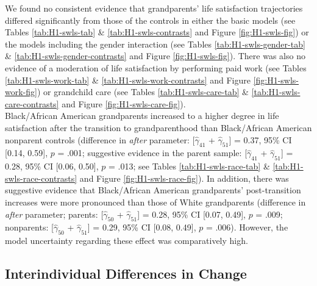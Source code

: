 \documentclass[
  english,
  man,floatsintext]{apa7}
\begin{document}
We found no consistent evidence that grandparents' life satisfaction trajectories differed significantly from those of the controls in either the basic models (see Tables \ref{tab:H1-swls-tab} \& \ref{tab:H1-swls-contrasts} and Figure \ref{fig:H1-swls-fig}) or the models including the gender interaction (see Tables \ref{tab:H1-swls-gender-tab} \& \ref{tab:H1-swls-gender-contrasts} and Figure \ref{fig:H1-swls-fig}). There was also no evidence of a moderation of life satisfaction by performing paid work (see Tables \ref{tab:H1-swls-work-tab} \& \ref{tab:H1-swls-work-contrasts} and Figure \ref{fig:H1-swls-work-fig}) or grandchild care (see Tables \ref{tab:H1-swls-care-tab} \& \ref{tab:H1-swls-care-contrasts} and Figure \ref{fig:H1-swls-care-fig}).\\
Black/African American grandparents increased to a higher degree in life satisfaction after the transition to grandparenthood than Black/African American nonparent controls (difference in \emph{after} parameter: {[}\(\hat{\gamma}_{41}\) + \(\hat{\gamma}_{51}\){]} = 0.37, 95\% CI {[}0.14, 0.59{]}, \(p\) = .001; suggestive evidence in the parent sample: {[}\(\hat{\gamma}_{41}\) + \(\hat{\gamma}_{51}\){]} = 0.28, 95\% CI {[}0.06, 0.50{]}, \(p\) = .013; see Tables \ref{tab:H1-swls-race-tab} \& \ref{tab:H1-swls-race-contrasts} and Figure \ref{fig:H1-swls-race-fig}). In addition, there was suggestive evidence that Black/African American grandparents' post-transition increases were more pronounced than those of White grandparents (difference in \emph{after} parameter; parents: {[}\(\hat{\gamma}_{50}\) + \(\hat{\gamma}_{51}\){]} = 0.28, 95\% CI {[}0.07, 0.49{]}, \(p\) = .009; nonparents: {[}\(\hat{\gamma}_{50}\) + \(\hat{\gamma}_{51}\){]} = 0.29, 95\% CI {[}0.08, 0.49{]}, \(p\) = .006). However, the model uncertainty regarding these effect was comparatively high.

\hypertarget{interindividual-differences-in-change}{%
\subsection{Interindividual Differences in Change}\label{interindividual-differences-in-change}}
\end{document}
